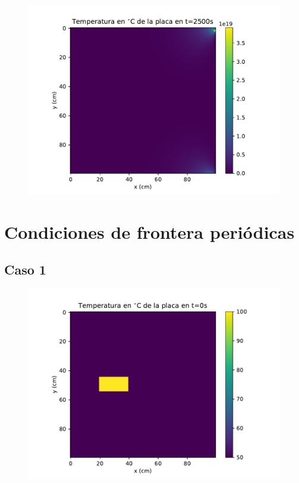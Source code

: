 \documentclass[12pt,letterpaper]{article}
\begin{document}
\begin{figure}[H]
\includegraphics{a2_2500.pdf}
\centering
\end{figure}

\section*{Condiciones de frontera periódicas}

\subsection*{Caso 1}

\begin{figure}[H]
\includegraphics{p1_0.pdf}
\centering
\end{figure}
\end{document}
